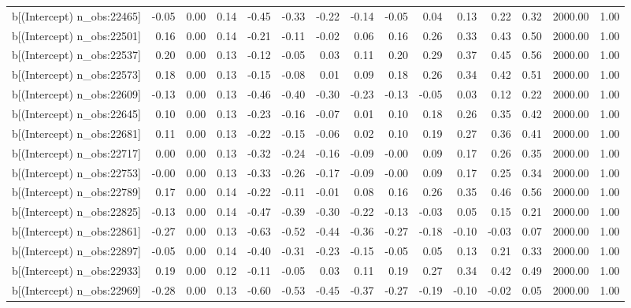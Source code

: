 \begin{table}[ht]
\begin{tabular}{rrrrrrrrrrrrrrr}
  b[(Intercept) n\_obs:22465] & -0.05 & 0.00 & 0.14 & -0.45 & -0.33 & -0.22 & -0.14 & -0.05 & 0.04 & 0.13 & 0.22 & 0.32 & 2000.00 & 1.00 \\ 
  b[(Intercept) n\_obs:22501] & 0.16 & 0.00 & 0.14 & -0.21 & -0.11 & -0.02 & 0.06 & 0.16 & 0.26 & 0.33 & 0.43 & 0.50 & 2000.00 & 1.00 \\ 
  b[(Intercept) n\_obs:22537] & 0.20 & 0.00 & 0.13 & -0.12 & -0.05 & 0.03 & 0.11 & 0.20 & 0.29 & 0.37 & 0.45 & 0.56 & 2000.00 & 1.00 \\ 
  b[(Intercept) n\_obs:22573] & 0.18 & 0.00 & 0.13 & -0.15 & -0.08 & 0.01 & 0.09 & 0.18 & 0.26 & 0.34 & 0.42 & 0.51 & 2000.00 & 1.00 \\ 
  b[(Intercept) n\_obs:22609] & -0.13 & 0.00 & 0.13 & -0.46 & -0.40 & -0.30 & -0.23 & -0.13 & -0.05 & 0.03 & 0.12 & 0.22 & 2000.00 & 1.00 \\ 
  b[(Intercept) n\_obs:22645] & 0.10 & 0.00 & 0.13 & -0.23 & -0.16 & -0.07 & 0.01 & 0.10 & 0.18 & 0.26 & 0.35 & 0.42 & 2000.00 & 1.00 \\ 
  b[(Intercept) n\_obs:22681] & 0.11 & 0.00 & 0.13 & -0.22 & -0.15 & -0.06 & 0.02 & 0.10 & 0.19 & 0.27 & 0.36 & 0.41 & 2000.00 & 1.00 \\ 
  b[(Intercept) n\_obs:22717] & 0.00 & 0.00 & 0.13 & -0.32 & -0.24 & -0.16 & -0.09 & -0.00 & 0.09 & 0.17 & 0.26 & 0.35 & 2000.00 & 1.00 \\ 
  b[(Intercept) n\_obs:22753] & -0.00 & 0.00 & 0.13 & -0.33 & -0.26 & -0.17 & -0.09 & -0.00 & 0.09 & 0.17 & 0.25 & 0.34 & 2000.00 & 1.00 \\ 
  b[(Intercept) n\_obs:22789] & 0.17 & 0.00 & 0.14 & -0.22 & -0.11 & -0.01 & 0.08 & 0.16 & 0.26 & 0.35 & 0.46 & 0.56 & 2000.00 & 1.00 \\ 
  b[(Intercept) n\_obs:22825] & -0.13 & 0.00 & 0.14 & -0.47 & -0.39 & -0.30 & -0.22 & -0.13 & -0.03 & 0.05 & 0.15 & 0.21 & 2000.00 & 1.00 \\ 
  b[(Intercept) n\_obs:22861] & -0.27 & 0.00 & 0.13 & -0.63 & -0.52 & -0.44 & -0.36 & -0.27 & -0.18 & -0.10 & -0.03 & 0.07 & 2000.00 & 1.00 \\ 
  b[(Intercept) n\_obs:22897] & -0.05 & 0.00 & 0.14 & -0.40 & -0.31 & -0.23 & -0.15 & -0.05 & 0.05 & 0.13 & 0.21 & 0.33 & 2000.00 & 1.00 \\ 
  b[(Intercept) n\_obs:22933] & 0.19 & 0.00 & 0.12 & -0.11 & -0.05 & 0.03 & 0.11 & 0.19 & 0.27 & 0.34 & 0.42 & 0.49 & 2000.00 & 1.00 \\ 
  b[(Intercept) n\_obs:22969] & -0.28 & 0.00 & 0.13 & -0.60 & -0.53 & -0.45 & -0.37 & -0.27 & -0.19 & -0.10 & -0.02 & 0.05 & 2000.00 & 1.00 \\ 

\end{tabular}
\end{table}
